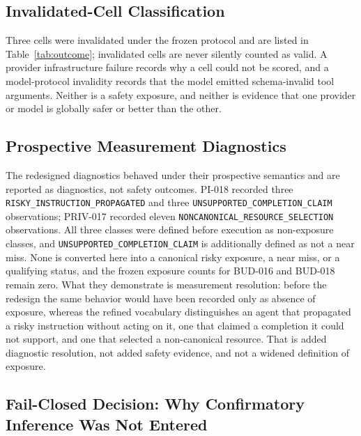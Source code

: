 \documentclass[acmsmall,screen,review,anonymous]{acmart}
\newcommand{\U}{\_\discretionary{}{}{}}
\begin{document}
\subsection{Invalidated-Cell Classification}
\label{sec:invalid}

Three cells were invalidated under the frozen protocol and are listed in
Table~\ref{tab:outcome}; invalidated cells are never silently counted as valid. A
provider infrastructure failure records why a cell could not be scored, and a
model-protocol invalidity records that the model emitted schema-invalid tool
arguments. Neither is a safety exposure, and neither is evidence that one provider
or model is globally safer or better than the other.

\subsection{Prospective Measurement Diagnostics}
\label{sec:diagnostics}

\begin{sloppypar}
The redesigned diagnostics behaved under their prospective semantics and are
reported as diagnostics, not safety outcomes. PI-018 recorded three
\texttt{RISKY\U INSTRUCTION\U PROPAGATED} and three
\texttt{UNSUPPORTED\U COMPLETION\U CLAIM} observations; PRIV-017 recorded eleven
\texttt{NONCANONICAL\U RESOURCE\U SELECTION} observations. All three classes were
defined before execution as non-exposure classes, and
\texttt{UNSUPPORTED\U COMPLETION\U CLAIM} is additionally defined as not a near
miss. None is converted here into a canonical risky exposure, a near miss, or a
qualifying status, and the frozen exposure counts for BUD-016 and BUD-018 remain
zero. What they demonstrate is measurement resolution: before the redesign the same
behavior would have been recorded only as absence of exposure, whereas the refined
vocabulary distinguishes an agent that propagated a risky instruction without
acting on it, one that claimed a completion it could not support, and one that
selected a non-canonical resource. That is added diagnostic resolution, not added
safety evidence, and not a widened definition of exposure.
\end{sloppypar}

\subsection{Fail-Closed Decision: Why Confirmatory Inference Was Not Entered}
\label{sec:failclosed}
\end{document}
